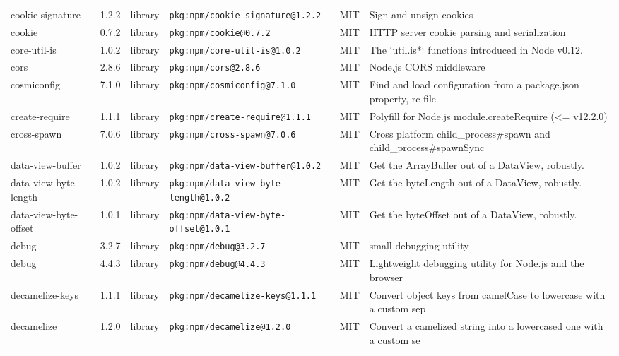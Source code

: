 \documentclass[11pt,a4paper]{article}
\begin{document}
\begin{longtable}{|p{4cm}|p{2cm}|p{1.6cm}|p{5cm}|p{1.5cm}|p{3.5cm}|}
\raggedright cookie-signature & 1.2.2 & library & \small\texttt{pkg:npm/cookie-signature@1.2.2} & MIT & \small Sign and unsign cookies \\
\raggedright cookie & 0.7.2 & library & \small\texttt{pkg:npm/cookie@0.7.2} & MIT & \small HTTP server cookie parsing and serialization \\
\raggedright core-util-is & 1.0.2 & library & \small\texttt{pkg:npm/core-util-is@1.0.2} & MIT & \small The `util.is*` functions introduced in Node v0.12. \\
\raggedright cors & 2.8.6 & library & \small\texttt{pkg:npm/cors@2.8.6} & MIT & \small Node.js CORS middleware \\
\raggedright cosmiconfig & 7.1.0 & library & \small\texttt{pkg:npm/cosmiconfig@7.1.0} & MIT & \small Find and load configuration from a package.json property, rc file \\
\raggedright create-require & 1.1.1 & library & \small\texttt{pkg:npm/create-require@1.1.1} & MIT & \small Polyfill for Node.js module.createRequire (\textless{}= v12.2.0) \\
\raggedright cross-spawn & 7.0.6 & library & \small\texttt{pkg:npm/cross-spawn@7.0.6} & MIT & \small Cross platform child\_process\#spawn and child\_process\#spawnSync \\
\raggedright data-view-buffer & 1.0.2 & library & \small\texttt{pkg:npm/data-view-buffer@1.0.2} & MIT & \small Get the ArrayBuffer out of a DataView, robustly. \\
\raggedright data-view-byte-length & 1.0.2 & library & \small\texttt{pkg:npm/data-view-byte-length@1.0.2} & MIT & \small Get the byteLength out of a DataView, robustly. \\
\raggedright data-view-byte-offset & 1.0.1 & library & \small\texttt{pkg:npm/data-view-byte-offset@1.0.1} & MIT & \small Get the byteOffset out of a DataView, robustly. \\
\raggedright debug & 3.2.7 & library & \small\texttt{pkg:npm/debug@3.2.7} & MIT & \small small debugging utility \\
\raggedright debug & 4.4.3 & library & \small\texttt{pkg:npm/debug@4.4.3} & MIT & \small Lightweight debugging utility for Node.js and the browser \\
\raggedright decamelize-keys & 1.1.1 & library & \small\texttt{pkg:npm/decamelize-keys@1.1.1} & MIT & \small Convert object keys from camelCase to lowercase with a custom sep \\
\raggedright decamelize & 1.2.0 & library & \small\texttt{pkg:npm/decamelize@1.2.0} & MIT & \small Convert a camelized string into a lowercased one with a custom se \\

\end{longtable}
\end{document}
